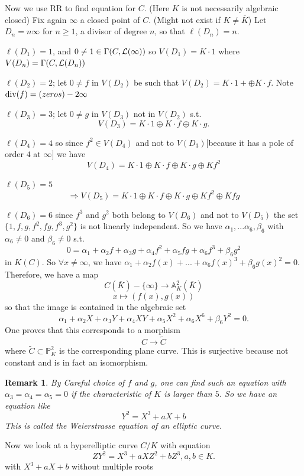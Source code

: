 \documentclass[11pt]{article}
\newtheorem{rmk}[thm]{Remark}
\newcommand{\affn}{\mathbb A}
\newcommand{\proj}{\mathbb P}
\newcommand{\call}{{\cal L}}
\renewcommand{\div}{\textnormal{div}}
\newcommand{\Lrta}{\Longrightarrow}
\newcommand{\lrta}{\longrightarrow}
\begin{document}
Now we use RR to find equation for $C$.  (Here $K$ is not necessarily algebraic closed) Fix again $\infty$ a closed point of $C$. (Might not exist if $K\neq \overline{K}$) Let $D_n=n\infty$ for $n\geq 1$, a divisor of degree $n$, so that $\ell(D_n)=n$. 

$\ell(D_1)=1$, and $0\neq 1 \in \Gamma(C,\call(\infty))$ so $V(D_1)=K\cdot 1$ where $V(D_n)=\Gamma(C,\call(D_n))$

$\ell(D_2)=2$; let $0\neq f$ in $V(D_2)$ be such that $V(D_2)=K\cdot 1+\oplus K\cdot f$. Note $\div(f)=(zeros)-2\infty$

$\ell(D_3)=3$; let $0\neq g$ in $V(D_3)$ not in $V(D_2)$ s.t. 
$$
V(D_3)=K\cdot 1\oplus K\cdot f\oplus K \cdot g.
$$

$\ell(D_4)=4$ so since $f^2\in V(D_4)$ and not to $V(D_3)$[because it has a pole of order $4$ at $\infty$]  we have 
$$
V(D_4)=K\cdot 1\oplus K\cdot f\oplus K \cdot g\oplus K f^2
$$

$\ell(D_5)=5$
$$
\Lrta V(D_5)=K\cdot 1\oplus K\cdot f\oplus K \cdot g\oplus K f^2\oplus Kfg
$$

$\ell(D_6)=6$
since $f^3$ and $g^2$ both belong to $V(D_6)$ and not to $V(D_5) $ the set $\{1,f,g,f^2,fg,f^3,g^2\}$ is not linearly independent. So we have $\alpha_1,...\alpha_6,\beta_6$ with $\alpha_6\neq 0 $ and $\beta_6\neq 0$ s.t.
$$
0=\alpha_1+\alpha_2 f+\alpha_3 g+\alpha_4 f^2+\alpha_5 fg+\alpha_6 f^3+\beta_6 g^2
$$
in $K(C)$. So $\forall x\neq \infty$, we have $\alpha_1+\alpha_2 f(x)+...+\alpha_6 f(x)^3+\beta_6 g(x)^2=0$. Therefore, we have a map
$$
C(\overline{K})-\{\infty\}\lrta \affn^2_K(\overline{K})
$$
$$
x\longmapsto (f(x),g(x))
$$
so that the  image is contained in the algebraic set
$$
\alpha_1+\alpha_2X+\alpha_3Y+\alpha_4XY+\alpha_5 X^2+\alpha_6 X^6+\beta_6 Y^2=0.
$$
One proves that this corresponds to a morphism
$$
C\lrta\tilde{C}
$$
where $\tilde{C}\subset \proj^2_K$ is the corresponding plane curve. This is surjective because not constant and is in fact an isomorphism. 

\begin{rmk}
By Careful choice of $f$ and $g$, one can find such an equation with $\alpha_3=\alpha_4=\alpha_5=0$ if the characteristic of $K$ is larger than $5$. So we have an equation like 
$$
Y^2=X^3+aX+b
$$
This is called the Weierstrasse equation of an elliptic curve. 
\end{rmk}


Now we look at a hyperelliptic  curve $C/K$ with equation
$$
ZY^2=X^3+aXZ^2+bZ^3, a, b\in K.
$$
with $X^3+aX+b$ without multiple roots 
\end{document}
